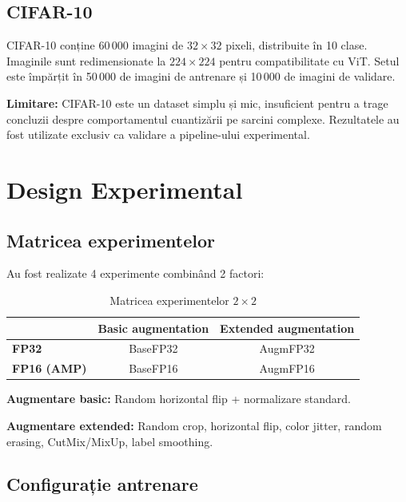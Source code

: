 \documentclass[12pt,a4paper]{article}
\begin{document}
\subsection{CIFAR-10}

CIFAR-10 conține 60\,000 imagini de $32 \times 32$ pixeli, distribuite în
10 clase. Imaginile sunt redimensionate la $224 \times 224$ pentru
compatibilitate cu ViT. Setul este împărțit în 50\,000 de imagini de antrenare
și 10\,000 de imagini de validare.

\textbf{Limitare:} CIFAR-10 este un dataset simplu și mic, insuficient pentru
a trage concluzii despre comportamentul cuantizării pe sarcini complexe.
Rezultatele au fost utilizate exclusiv ca validare a pipeline-ului experimental.

\section{Design Experimental}

\subsection{Matricea experimentelor}

Au fost realizate 4 experimente combinând 2 factori:

\begin{table}[H]
  \centering
  \caption{Matricea experimentelor $2 \times 2$}
  \begin{tabular}{lcc}
    \toprule
    & \textbf{Basic augmentation} & \textbf{Extended augmentation} \\
    \midrule
    \textbf{FP32} & BaseFP32 & AugmFP32 \\
    \textbf{FP16 (AMP)} & BaseFP16 & AugmFP16 \\
    \bottomrule
  \end{tabular}
  \label{tab:experiment_matrix}
\end{table}

\textbf{Augmentare basic:} Random horizontal flip + normalizare standard.

\textbf{Augmentare extended:} Random crop, horizontal flip, color jitter,
random erasing, CutMix/MixUp, label smoothing.

\subsection{Configurație antrenare}
\end{document}
